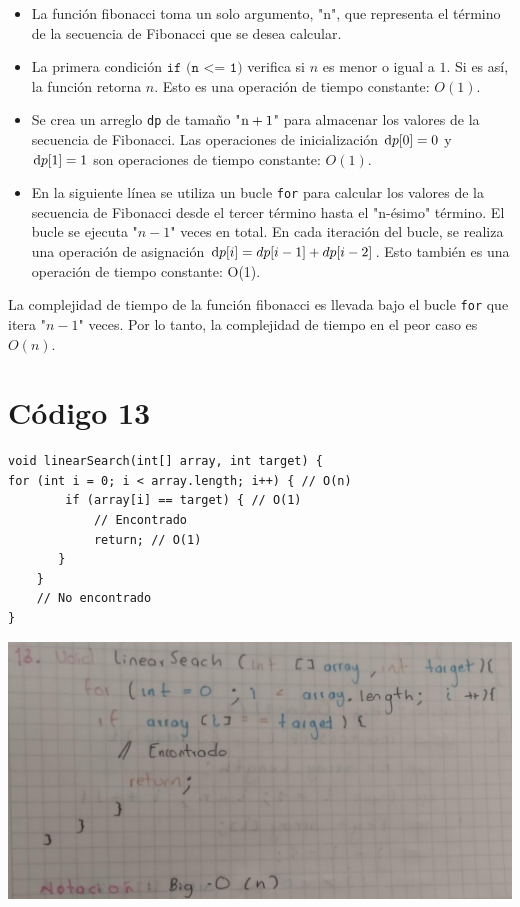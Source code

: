 \documentclass[a4paper,onecolumn,10pt]{article}
\begin{document}
\begin{itemize}
    \item La función fibonacci toma un solo argumento, "n", que representa el término de la secuencia de Fibonacci que se desea calcular.

     \item La primera condición $\texttt{if (n <= 1)}$ verifica si $n$ es menor o igual a $1$. Si es así, la función retorna $n$. Esto es una operación de tiempo constante: $O(1)$.

     \item Se crea un arreglo \texttt{dp} de tamaño "$\text n + 1$" para almacenar los valores de la secuencia de Fibonacci. Las operaciones de inicialización $\text dp[0] = 0$ y $\text dp[1] = 1$ son operaciones de tiempo constante: $O(1)$.

     \item En la siguiente línea se utiliza un bucle \texttt{for} para calcular los valores de la secuencia de Fibonacci desde el tercer término hasta el "n-ésimo" término. El bucle se ejecuta "$n-1$" veces en total. En cada iteración del bucle, se realiza una operación de asignación $\text dp[i] = dp[i - 1] + dp[i - 2]$. Esto también es una operación de tiempo constante: O(1).
     
\end{itemize}

La complejidad de tiempo de la función fibonacci es llevada bajo el bucle \texttt{for} que itera "$n-1$" veces. Por lo tanto, la complejidad de tiempo en el peor caso es $O(n)$.

\section{Código 13}
\begin{verbatim}
void linearSearch(int[] array, int target) {
for (int i = 0; i < array.length; i++) { // O(n)
        if (array[i] == target) { // O(1)
            // Encontrado
            return; // O(1)     
	   }
    }
    // No encontrado
}

\end{verbatim}

\includegraphics[width=1\linewidth]{imagenes/punto 13.jpeg}
\end{document}
